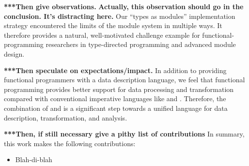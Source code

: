 \textbf{***Then give observations.}
\textbf{Actually, this observation should go in the conclusion.  It's
  distracting here.}
Our ``types as modules'' implementation strategy encountered the
  limits of the \ocaml{} module system in multiple ways. It therefore
  provides a natural, well-motivated challenge example for
  functional-programming researchers in type-directed programming and
  advanced module design.

\textbf{***Then speculate on expectations/impact.}
In addition to providing
  functional programmers with a data description language, we
  feel that functional programming provides better support for data
  processing and transformation compared with conventional imperative
  languages like \C{} and \java{}. Therefore, the combination of
  \padsml{} and \ocaml{} is a significant step towards a unified
  language for data description, transformation, and analysis.


\textbf{***Then, if still necessary give a pithy list of contributions}
In summary, this work makes the following contributions:

\begin{itemize}
\item Blah-di-blah
\end{itemize}


